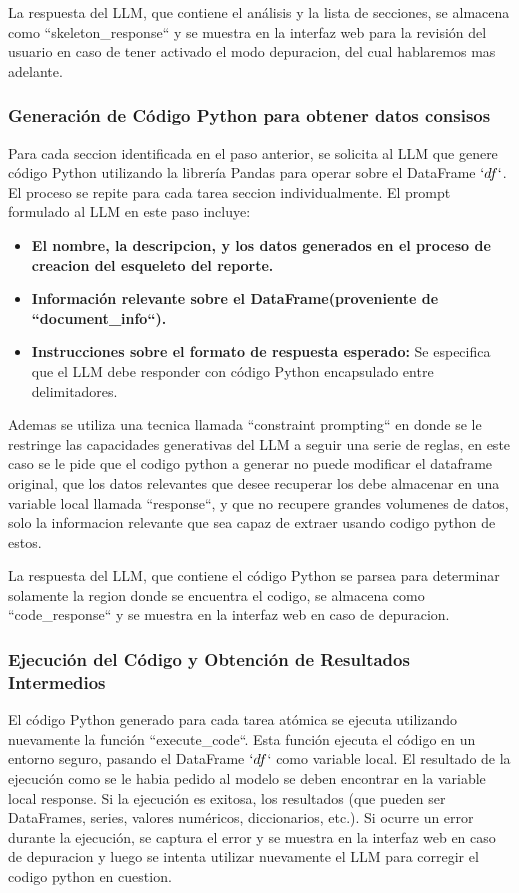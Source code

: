 La respuesta del LLM, que contiene el análisis y la lista de secciones,  se almacena como ``skeleton\_response`` y se muestra en la interfaz web para la revisión del usuario en caso de tener activado el modo depuracion, del cual hablaremos mas adelante.

\subsubsection{Generación de Código Python para obtener datos consisos}

Para cada seccion identificada en el paso anterior, se solicita al LLM que genere código Python utilizando la librería Pandas para operar sobre el DataFrame $`df`$.  El proceso se repite para cada tarea seccion individualmente.  El prompt formulado al LLM en este paso incluye:

\begin{itemize}
	\item \textbf{El nombre, la descripcion, y los datos generados en el proceso de creacion del esqueleto del reporte.}
	\item \textbf{Información relevante sobre el DataFrame(proveniente de ``document\_info``).}
	\item \textbf{Instrucciones sobre el formato de respuesta esperado:} Se especifica que el LLM debe responder con código Python encapsulado entre delimitadores.
\end{itemize}
Ademas se utiliza una tecnica llamada ``constraint prompting`` en donde se le restringe las capacidades generativas del LLM a seguir una serie de reglas, en este caso se le pide que el codigo python a generar no puede modificar el dataframe original, que los datos relevantes que desee recuperar los debe almacenar en una variable local llamada ``response``, y que no recupere grandes volumenes de datos, solo la informacion relevante que sea capaz de extraer usando codigo python de estos.

La respuesta del LLM, que contiene el código Python se parsea para determinar solamente la region donde se encuentra el codigo, se almacena como ``code\_response`` y se muestra en la interfaz web en caso de depuracion.

\subsubsection{Ejecución del Código y Obtención de Resultados Intermedios}

El código Python generado para cada tarea atómica se ejecuta utilizando nuevamente la función ``execute\_code``.  Esta función ejecuta el código en un entorno seguro,  pasando el DataFrame $`df$` como variable local.  El resultado de la ejecución como se le habia pedido al modelo se deben encontrar en la variable local response. Si la ejecución es exitosa,  los resultados (que pueden ser DataFrames, series, valores numéricos, diccionarios, etc.).  Si ocurre un error durante la ejecución,  se captura el error y se muestra en la interfaz web en caso de depuracion y  luego se intenta utilizar nuevamente el LLM para corregir el codigo python en cuestion.

